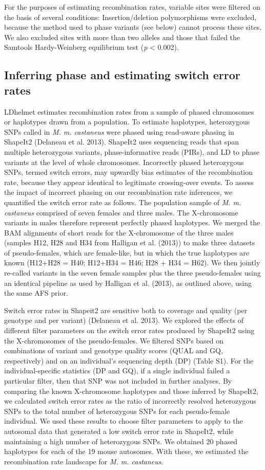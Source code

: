         	For the purposes of estimating recombination rates, variable sites were filtered on the basis of several conditions: Insertion/deletion polymorphisms were excluded, because the method used to phase variants (see below) cannot process these sites. We also excluded sites with more than two alleles and those that failed the Samtools Hardy-Weinberg equilibrium test (\emph{p} < 0.002).
 
\subsection{Inferring phase and estimating switch error rates}
 
LDhelmet estimates recombination rates from a sample of phased chromosomes or haplotypes drawn from a population. To estimate haplotypes, heterozygous SNPs called in \emph{M. m. castaneus} were phased using read-aware phasing in ShapeIt2 (Delaneau et al. 2013). ShapeIt2 uses sequencing reads that span multiple heterozygous variants, phase-informative reads (PIRs), and LD to phase variants at the level of whole chromosomes. Incorrectly phased heterozygous SNPs, termed switch errors, may upwardly bias estimates of the recombination rate, because they appear identical to legitimate crossing-over events. To assess the impact of incorrect phasing on our recombination rate inferences, we quantified the switch error rate as follows. The population sample of \emph{M. m. castaneus} comprised of seven females and three males. The X-chromosome variants in males therefore represent perfectly phased haplotypes. We merged the BAM alignments of short reads for the X-chromosome of the three males (samples H12, H28 and H34 from Halligan et al. (2013)) to make three datasets of pseudo-females, which are female-like, but in which the true haplotypes are known (H12+H28 = H40; H12+H34 = H46; H28 + H34 = H62). We then jointly re-called variants in the seven female samples plus the three pseudo-females using an identical pipeline as used by Halligan et al. (2013), as outlined above, using the same AFS prior.
 
Switch error rates in Shapeit2 are sensitive both to coverage and quality (per genotype and per variant) (Delaneau et al. 2013). We explored the effects of different filter parameters on the switch error rates produced by ShapeIt2 using the X-chromosomes of the pseudo-females. We filtered SNPs based on combinations of variant and genotype quality scores (QUAL and GQ, respectively) and on an individual’s sequencing depth (DP) (Table S1). For the individual-specific statistics (DP and GQ), if a single individual failed a particular filter, then that SNP was not included in further analyses. By comparing the known X-chromosome haplotypes and those inferred by ShapeIt2, we calculated switch error rates as the ratio of incorrectly resolved heterozygous SNPs to the total number of heterozygous SNPs for each pseudo-female individual. We used these results to choose filter parameters to apply to the autosomal data that generated a low switch error rate in ShapeIt2, while maintaining a high number of heterozygous SNPs. We obtained 20 phased haplotypes for each of the 19 mouse autosomes. With these, we estimated the recombination rate landscape for \emph{M. m. castaneus}.
 
